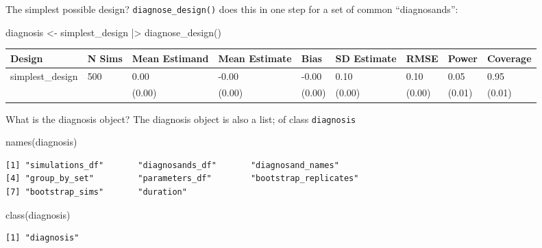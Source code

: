 \documentclass[
  11pt,
  ignorenonframetext,
]{beamer}
\newenvironment{Shaded}{\begin{snugshade}}{\end{snugshade}}
\newcommand{\FunctionTok}[1]{\textcolor[rgb]{0.28,0.35,0.67}{#1}}
\newcommand{\NormalTok}[1]{\textcolor[rgb]{0.00,0.23,0.31}{#1}}
\newcommand{\OtherTok}[1]{\textcolor[rgb]{0.00,0.23,0.31}{#1}}
\newcommand{\SpecialCharTok}[1]{\textcolor[rgb]{0.37,0.37,0.37}{#1}}
\begin{document}
\begin{frame}[fragile]{The simplest possible design?}
\protect\hypertarget{the-simplest-possible-design-1}{}
\texttt{diagnose\_design()} does this in one step for a set of common
``diagnosands'':

\begin{Shaded}
\begin{Highlighting}[]
\NormalTok{diagnosis }\OtherTok{\textless{}{-}}
\NormalTok{  simplest\_design }\SpecialCharTok{|\textgreater{}}
  \FunctionTok{diagnose\_design}\NormalTok{()}
\end{Highlighting}
\end{Shaded}

\begin{table}
\centering
\begin{tabular}{l|l|l|l|l|l|l|l|l}
\hline
Design & N Sims & Mean Estimand & Mean Estimate & Bias & SD Estimate & RMSE & Power & Coverage\\
\hline
simplest\_design & 500 & 0.00 & -0.00 & -0.00 & 0.10 & 0.10 & 0.05 & 0.95\\
\hline
 &  & (0.00) & (0.00) & (0.00) & (0.00) & (0.00) & (0.01) & (0.01)\\
\hline
\end{tabular}
\end{table}
\end{frame}

\begin{frame}[fragile]{What is the diagnosis object?}
\protect\hypertarget{what-is-the-diagnosis-object}{}
The diagnosis object is also a list; of class \texttt{diagnosis}

\begin{Shaded}
\begin{Highlighting}[]
\FunctionTok{names}\NormalTok{(diagnosis)}
\end{Highlighting}
\end{Shaded}

\begin{verbatim}
[1] "simulations_df"       "diagnosands_df"       "diagnosand_names"    
[4] "group_by_set"         "parameters_df"        "bootstrap_replicates"
[7] "bootstrap_sims"       "duration"            
\end{verbatim}

\begin{Shaded}
\begin{Highlighting}[]
\FunctionTok{class}\NormalTok{(diagnosis)}
\end{Highlighting}
\end{Shaded}

\begin{verbatim}
[1] "diagnosis"
\end{verbatim}
\end{frame}
\end{document}
